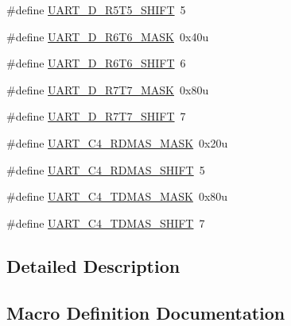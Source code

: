 \begin{DoxyCompactItemize}
\item 
\#define \hyperlink{group___u_a_r_t___register___masks_gae69f7102190028c0404e6ace547ae211}{U\+A\+R\+T\+\_\+\+D\+\_\+\+R5\+T5\+\_\+\+S\+H\+I\+FT}~5
\item 
\#define \hyperlink{group___u_a_r_t___register___masks_ga866bfef731e0bc24a2afd8d8131ba93a}{U\+A\+R\+T\+\_\+\+D\+\_\+\+R6\+T6\+\_\+\+M\+A\+SK}~0x40u
\item 
\#define \hyperlink{group___u_a_r_t___register___masks_ga2437f29b3af453c9abac355cc0f83f17}{U\+A\+R\+T\+\_\+\+D\+\_\+\+R6\+T6\+\_\+\+S\+H\+I\+FT}~6
\item 
\#define \hyperlink{group___u_a_r_t___register___masks_ga1f6a350925baddf74b5d3398c52b648f}{U\+A\+R\+T\+\_\+\+D\+\_\+\+R7\+T7\+\_\+\+M\+A\+SK}~0x80u
\item 
\#define \hyperlink{group___u_a_r_t___register___masks_gad2b538e10e336537f0adf3c63317bc69}{U\+A\+R\+T\+\_\+\+D\+\_\+\+R7\+T7\+\_\+\+S\+H\+I\+FT}~7
\item 
\#define \hyperlink{group___u_a_r_t___register___masks_ga51946763b696d9d65cc421b08995923a}{U\+A\+R\+T\+\_\+\+C4\+\_\+\+R\+D\+M\+A\+S\+\_\+\+M\+A\+SK}~0x20u
\item 
\#define \hyperlink{group___u_a_r_t___register___masks_ga4c44b0d9f3315d9fad52f1c2b9e2d347}{U\+A\+R\+T\+\_\+\+C4\+\_\+\+R\+D\+M\+A\+S\+\_\+\+S\+H\+I\+FT}~5
\item 
\#define \hyperlink{group___u_a_r_t___register___masks_gaddd38f2fce38e0a363744ab50071c471}{U\+A\+R\+T\+\_\+\+C4\+\_\+\+T\+D\+M\+A\+S\+\_\+\+M\+A\+SK}~0x80u
\item 
\#define \hyperlink{group___u_a_r_t___register___masks_ga60d9c5b3d3d01f52b013c8d22363ff24}{U\+A\+R\+T\+\_\+\+C4\+\_\+\+T\+D\+M\+A\+S\+\_\+\+S\+H\+I\+FT}~7
\end{DoxyCompactItemize}


\subsection{Detailed Description}


\subsection{Macro Definition Documentation}
